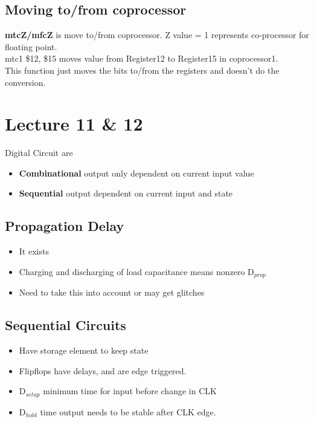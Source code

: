 \documentclass{article}
\begin{document}
	\subsection*{Moving to/from coprocessor}
	\textbf{mtcZ/mfcZ} is move to/from coprocessor. Z value = 1 represents co-processor for floating point.\\

	mtc1 \$12, \$15 moves value from Register12 to Register15 in coprocessor1.\\

	This function just moves the bits to/from the registers and doesn't do the conversion.

\section{Lecture 11 \& 12}
	Digital Circuit are
	\begin{itemize}
		\item \textbf{Combinational}	output only dependent on current input value
		\item \textbf{Sequential} 	output dependent on current input and state
	\end{itemize}

	\subsection*{Propagation Delay}
		\begin{itemize}
			\item It exists
			\item Charging and discharging of load capacitance means nonzero D$_{prop}$
			\item Need to take this into account or may get glitches
		\end{itemize}

	\subsection*{Sequential Circuits}
		\begin{itemize}
			\item Have storage element to keep state
			\item Flipflops have delays, and are edge triggered.
			\item D$_{setup}$ minimum time for input before change in CLK
			\item D$_{hold}$ time output needs to be stable after CLK edge.

		\end{itemize}
\end{document}
